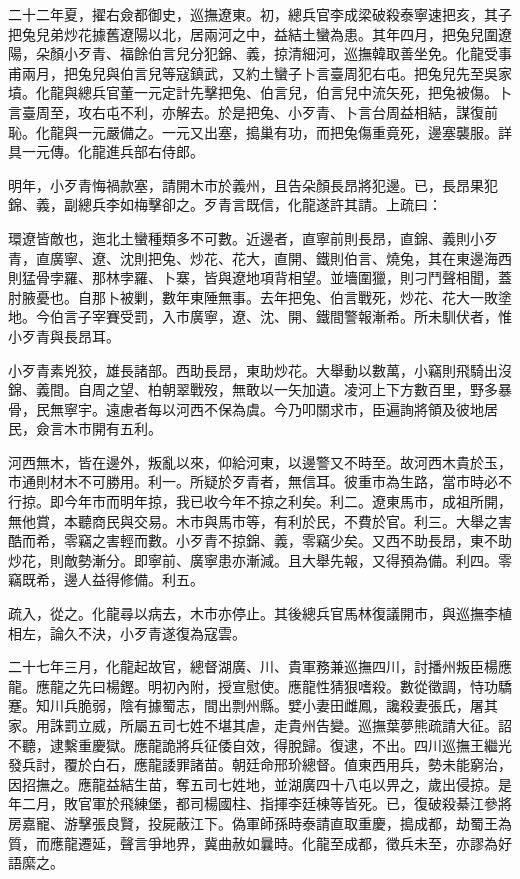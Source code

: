 \begin{pinyinscope}
二十二年夏，擢右僉都御史，巡撫遼東。初，總兵官李成梁破殺泰寧速把亥，其子把兔兒弟炒花據舊遼陽以北，居兩河之中，益結土蠻為患。其年四月，把兔兒圍遼陽，朵顏小歹青、福餘伯言兒分犯錦、義，掠清細河，巡撫韓取善坐免。化龍受事甫兩月，把兔兒與伯言兒等寇鎮武，又約土蠻子卜言臺周犯右屯。把兔兒先至吳家墳。化龍與總兵官董一元定計先擊把兔、伯言兒，伯言兒中流矢死，把兔被傷。卜言臺周至，攻右屯不利，亦解去。於是把兔、小歹青、卜言台周益相結，謀復前恥。化龍與一元嚴備之。一元又出塞，搗巢有功，而把兔傷重竟死，邊塞襲服。詳具一元傳。化龍進兵部右侍郎。

明年，小歹青悔禍款塞，請開木市於義州，且告朵顏長昂將犯邊。已，長昂果犯錦、義，副總兵李如梅擊卻之。歹青言既信，化龍遂許其請。上疏曰：

環遼皆敵也，迤北土蠻種類多不可數。近邊者，直寧前則長昂，直錦、義則小歹青，直廣寧、遼、沈則把兔、炒花、花大，直開、鐵則伯言、燒兔，其在東邊海西則猛骨孛羅、那林孛羅、卜寨，皆與遼地項背相望。並墻圍獵，則刁鬥聲相聞，蓋肘腋憂也。自那卜被剿，數年東陲無事。去年把兔、伯言戰死，炒花、花大一敗塗地。今伯言子宰賽受罰，入市廣寧，遼、沈、開、鐵間警報漸希。所未馴伏者，惟小歹青與長昂耳。

小歹青素兇狡，雄長諸部。西助長昂，東助炒花。大舉動以數萬，小竊則飛騎出沒錦、義間。自周之望、柏朝翠戰歿，無敢以一矢加遺。凌河上下方數百里，野多暴骨，民無寧宇。遠慮者每以河西不保為虞。今乃叩關求市，臣遍詢將領及彼地居民，僉言木市開有五利。

河西無木，皆在邊外，叛亂以來，仰給河東，以邊警又不時至。故河西木貴於玉，市通則材木不可勝用。利一。所疑於歹青者，無信耳。彼重市為生路，當市時必不行掠。即今年市而明年掠，我已收今年不掠之利矣。利二。遼東馬市，成祖所開，無他賞，本聽商民與交易。木市與馬市等，有利於民，不費於官。利三。大舉之害酷而希，零竊之害輕而數。小歹青不掠錦、義，零竊少矣。又西不助長昂，東不助炒花，則敵勢漸分。即寧前、廣寧患亦漸減。且大舉先報，又得預為備。利四。零竊既希，邊人益得修備。利五。

疏入，從之。化龍尋以病去，木市亦停止。其後總兵官馬林復議開市，與巡撫李植相左，論久不決，小歹青遂復為寇雲。

二十七年三月，化龍起故官，總督湖廣、川、貴軍務兼巡撫四川，討播州叛臣楊應龍。應龍之先曰楊鏗。明初內附，授宣慰使。應龍性猜狠嗜殺。數從徵調，恃功驕蹇。知川兵脆弱，陰有據蜀志，間出剽州縣。嬖小妻田雌鳳，讒殺妻張氏，屠其家。用誅罰立威，所屬五司七姓不堪其虐，走貴州告變。巡撫葉夢熊疏請大征。詔不聽，逮繫重慶獄。應龍詭將兵征倭自效，得脫歸。復逮，不出。四川巡撫王繼光發兵討，覆於白石，應龍諉罪諸苗。朝廷命邢玠總督。值東西用兵，勢未能窮治，因招撫之。應龍益結生苗，奪五司七姓地，並湖廣四十八屯以畀之，歲出侵掠。是年二月，敗官軍於飛練堡，都司楊國柱、指揮李廷棟等皆死。已，復破殺綦江參將房嘉寵、游擊張良賢，投屍蔽江下。偽軍師孫時泰請直取重慶，搗成都，劫蜀王為質，而應龍遷延，聲言爭地界，冀曲赦如曩時。化龍至成都，徵兵未至，亦謬為好語縻之。


\end{pinyinscope}
